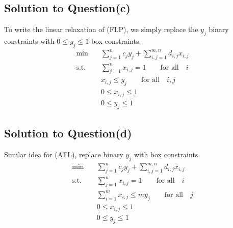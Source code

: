 \documentclass[a4paper]{article}
\begin{document}
\subsection{Solution to Question(c)}
To write the linear relaxation of (FLP), we simply replace the $y_j$ binary constraints with $0 \leq y_j \leq 1$ box constraints.\\
\begin{align*}
    \text{min} \quad &\sum_{j=1}^n c_jy_j+\sum_{i,j=1}^{m,n} d_{i,j}x_{i,j}\\\tag{FLP-LR}
    \text{s.t.}\quad &\sum_{j=1}^n x_{i,j}=1 \qquad\text{for all} \quad i\\
    &x_{i,j} \leq y_j \qquad\text{for all} \quad i,j\\
    &0\leq x_{i,j}\leq 1\\
    &0\leq y_{j}\leq 1 
\end{align*}

\subsection{Solution to Question(d)}
Similar idea for (AFL), replace binary $y_j$ with box constraints.\\
\begin{align*}
    \text{min} \quad &\sum_{j=1}^n c_jy_j+\sum_{i,j=1}^{m,n} d_{i,j}x_{i,j}\\\tag{AFL-LR}
    \text{s.t.}\quad &\sum_{j=1}^n x_{i,j}=1 \qquad\text{for all} \quad i\\
    &\sum\limits_{i=1}^m x_{i,j} \leq my_j \qquad\text{for all} \quad j\\
    &0\leq x_{i,j}\leq 1\\
    &0\leq y_{j}\leq 1\\
\end{align*}
\end{document}

